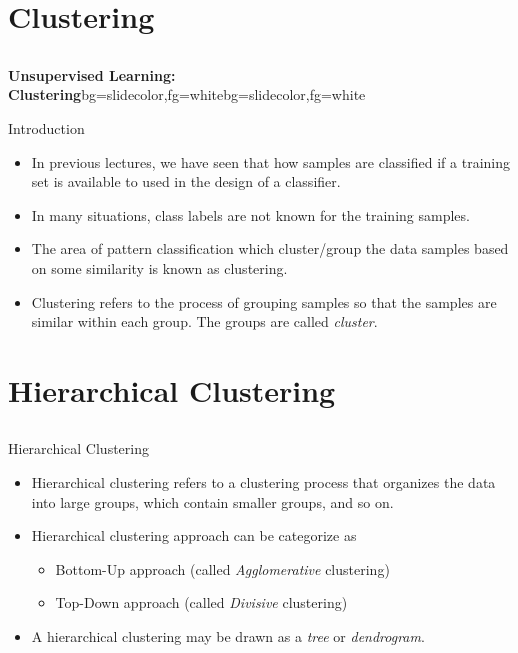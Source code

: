 \section{Clustering}
\subsection{}
\begin{frame}{}
\begin{variableblock}{\centering \Large \textbf{\vspace{4pt}\newline Unsupervised Learning: Clustering\vspace{4pt}}}{bg=slidecolor,fg=white}{bg=slidecolor,fg=white}
\end{variableblock}
\end{frame}

\begin{frame}{Introduction}
\begin{itemize}
\item In previous lectures, we have seen that how samples are classified if a training set is available to used in the design of a classifier.
\item In many situations, class labels are not known for the training samples.
\item The area of pattern classification which cluster/group the data samples based on some similarity is known as clustering.
\item Clustering refers to the process of grouping samples so that the samples are similar within each group. The groups are called \textit{\color{slidecolor}cluster}.
\end{itemize}
\end{frame}

\section{Hierarchical Clustering}
\subsection{}
\begin{frame}{Hierarchical Clustering}
\begin{itemize}
\item Hierarchical clustering refers to a clustering process that organizes the data into large groups, which contain smaller groups, and so on.
\item Hierarchical clustering approach can be categorize as
\begin{itemize}
\item Bottom-Up approach (called \textit{\color{slidecolor}Agglomerative} clustering)
\item Top-Down approach (called \textit{\color{slidecolor}Divisive} clustering)
\end{itemize}
\item A hierarchical clustering may be drawn as a \textit{\color{slidecolor}tree} or \textit{\color{slidecolor}dendrogram}.
\end{itemize}
\end{frame}

